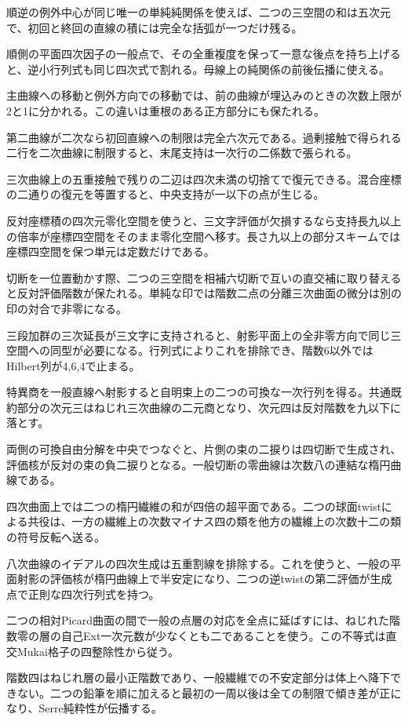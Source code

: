 \documentclass[11pt,a4paper]{ltjsarticle}
\begin{document}
順逆の例外中心が同じ唯一の単純純関係を使えば、二つの三空間の和は五次元で、初回と終回の直線の積には完全な括弧が一つだけ残る。

順側の平面四次因子の一般点で、その全重複度を保って一意な後点を持ち上げると、逆小行列式も同じ四次式で割れる。母線上の純関係の前後伝播に使える。

主曲線への移動と例外方向での移動では、前の曲線が埋込みのときの次数上限が2と1に分かれる。この違いは重根のある正方部分にも保たれる。

第二曲線が二次なら初回直線への制限は完全六次元である。過剰接触で得られる二行を二次曲線に制限すると、末尾支持は一次行の二係数で張られる。

三次曲線上の五重接触で残りの二辺は四次未満の切捨てで復元できる。混合座標の二通りの復元を等置すると、中央支持が一以下の点が生じる。

反対座標積の四次元零化空間を使うと、三文字評価が欠損するなら支持長九以上の倍率が座標四空間をそのまま零化空間へ移す。長さ九以上の部分スキームでは座標四空間を保つ単元は定数だけである。

切断を一位置動かす際、二つの三空間を相補六切断で互いの直交補に取り替えると反対評価階数が保たれる。単純な印では階数二点の分離三次曲面の微分は別の印の対合で非零になる。

三段加群の三次延長が三文字に支持されると、射影平面上の全非零方向で同じ三空間への同型が必要になる。行列式によりこれを排除でき、階数6以外ではHilbert列が4,6,4で止まる。

特異商を一般直線へ射影すると自明束上の二つの可換な一次行列を得る。共通既約部分の次元三はねじれ三次曲線の二元商となり、次元四は反対階数を九以下に落とす。

両側の可換自由分解を中央でつなぐと、片側の束の二捩りは四切断で生成され、評価核が反対の束の負二捩りとなる。一般切断の零曲線は次数八の連結な楕円曲線である。

四次曲面上では二つの楕円繊維の和が四倍の超平面である。二つの球面twistによる共役は、一方の繊維上の次数マイナス四の類を他方の繊維上の次数十二の類の符号反転へ送る。

八次曲線のイデアルの四次生成は五重割線を排除する。これを使うと、一般の平面射影の評価核が楕円曲線上で半安定になり、二つの逆twistの第二評価が生成点で正則な四次行列式を持つ。

二つの相対Picard曲面の間で一般の点層の対応を全点に延ばすには、ねじれた階数零の層の自己Ext一次元数が少なくとも二であることを使う。この不等式は直交Mukai格子の四整除性から従う。

階数四はねじれ層の最小正階数であり、一般繊維での不安定部分は体上へ降下できない。二つの鉛筆を順に加えると最初の一周以後は全ての制限で傾き差が正になり、Serre純粋性が伝播する。
\end{document}
